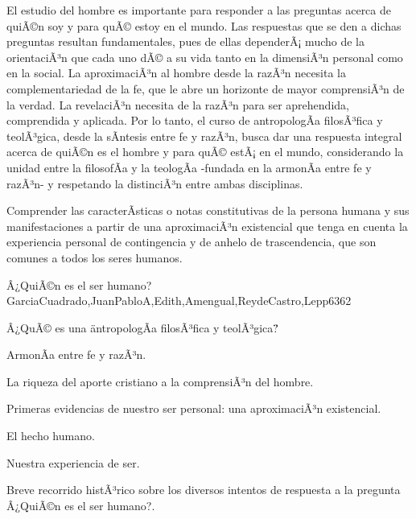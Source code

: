 \begin{syllabus}


\begin{justification}
El estudio del hombre es importante para responder a las preguntas acerca de quiÃ©n soy y para quÃ© estoy en el mundo. Las respuestas que se den a dichas preguntas resultan fundamentales, pues de ellas dependerÃ¡ mucho de la orientaciÃ³n que cada uno dÃ© a su vida tanto en la dimensiÃ³n personal como en la social. La aproximaciÃ³n al hombre desde la razÃ³n necesita la complementariedad de la fe, que le abre un horizonte de mayor comprensiÃ³n de la verdad. La revelaciÃ³n necesita de la razÃ³n para ser aprehendida, comprendida y aplicada. Por lo tanto, el curso de antropologÃ­a filosÃ³fica y teolÃ³gica, desde la sÃ­ntesis entre fe y razÃ³n, busca dar una respuesta integral acerca de quiÃ©n es el hombre y para quÃ© estÃ¡ en el mundo, considerando la unidad entre la filosofÃ­a y la teologÃ­a -fundada en la armonÃ­a entre fe y razÃ³n- y respetando la distinciÃ³n entre ambas disciplinas.
\end{justification}

\begin{goals}
\item Comprender las caracterÃ­sticas o notas constitutivas de la persona humana y sus manifestaciones a partir de una aproximaciÃ³n existencial que tenga en cuenta la experiencia personal de contingencia y de anhelo de trascendencia, que son comunes a todos los seres humanos.
\end{goals}

\begin{outcomes}
\end{outcomes}

\begin{unit}{Â¿QuiÃ©n es el ser humano?}{GarciaCuadrado,JuanPabloA,Edith,Amengual,ReydeCastro,Lepp63}{6}{2}
\begin{topics}
 		\item Â¿QuÃ© es una \"antropologÃ­a filosÃ³fica y teolÃ³gica\"?
 		\item ArmonÃ­a entre fe y razÃ³n.
 		\item La riqueza del aporte cristiano a la comprensiÃ³n del hombre.
 		\item Primeras evidencias de nuestro ser personal: una aproximaciÃ³n existencial.
 		\item El hecho humano.
 		\item Nuestra experiencia de ser.
 		\item Breve recorrido histÃ³rico sobre los diversos intentos de respuesta a la pregunta Â¿QuiÃ©n es el ser humano?. 
\end{topics}


\end{unit}
\end{syllabus}
